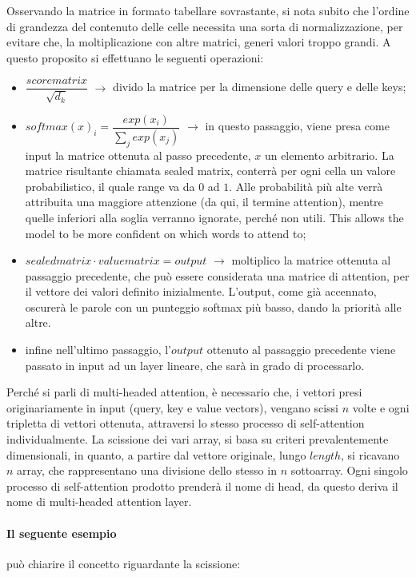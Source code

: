 Osservando la matrice in formato tabellare sovrastante, si nota subito che l'ordine di grandezza del contenuto delle celle necessita una sorta di normalizzazione, per evitare che, la moltiplicazione con altre matrici, generi valori troppo grandi. A questo proposito si effettuano le seguenti operazioni:
\begin{itemize}
	\item $\dfrac{score matrix}{\sqrt{d_{k}}}$ $\rightarrow$ divido la matrice per la dimensione delle query e delle keys;
	\item $softmax(x)_{i} = \dfrac{exp(x_i)}{\sum_{j} exp(x_j)}$ $\rightarrow$ in questo passaggio, viene presa come input la matrice ottenuta al passo precedente, $x$ un elemento arbitrario. La matrice risultante chiamata sealed matrix, conterrà per ogni cella un valore probabilistico, il quale range va da $0$ ad $1$. Alle probabilità più alte verrà attribuita una maggiore attenzione (da qui, il termine attention), mentre quelle inferiori alla soglia verranno ignorate, perché non utili. This allows the model to be more confident on which words to attend to;
	\item $sealed matrix \cdot value matrix = output$ $\rightarrow$ moltiplico la matrice ottenuta al passaggio precedente, che può essere considerata una matrice di attention, per il vettore dei valori definito inizialmente. L'output, come già accennato, oscurerà le parole con un punteggio softmax più basso, dando la priorità alle altre.
	\item infine nell'ultimo passaggio, l'$output$ ottenuto al passaggio precedente viene passato in input ad un layer lineare, che sarà in grado di processarlo.
\end{itemize}

Perché si parli di multi-headed attention, è necessario che, i vettori presi originariamente in input (query, key e value vectors), vengano scissi $n$ volte e ogni tripletta di vettori ottenuta, attraversi lo stesso processo di self-attention individualmente. La scissione dei vari array, si basa su criteri prevalentemente dimensionali, in quanto, a partire dal  vettore originale, lungo $length$, si ricavano $n$ array, che rappresentano una divisione dello stesso in $n$ sottoarray.
Ogni singolo processo di self-attention prodotto prenderà il nome di head, da questo deriva il nome di multi-headed attention layer. 

\paragraph{Il seguente esempio} può chiarire il concetto riguardante la scissione:

